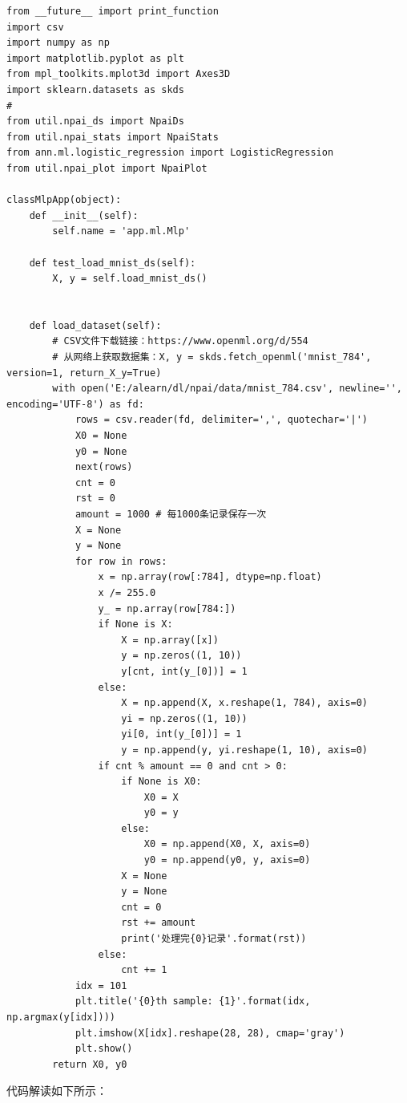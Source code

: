 \documentclass[UTF8]{article}
\begin{document}
\begin{lstlisting}
from __future__ import print_function
import csv
import numpy as np
import matplotlib.pyplot as plt
from mpl_toolkits.mplot3d import Axes3D
import sklearn.datasets as skds
#
from util.npai_ds import NpaiDs
from util.npai_stats import NpaiStats
from ann.ml.logistic_regression import LogisticRegression
from util.npai_plot import NpaiPlot

classMlpApp(object):
    def __init__(self):
        self.name = 'app.ml.Mlp'

    def test_load_mnist_ds(self):
        X, y = self.load_mnist_ds()


    def load_dataset(self):
        # CSV文件下载链接：https://www.openml.org/d/554
        # 从网络上获取数据集：X, y = skds.fetch_openml('mnist_784', version=1, return_X_y=True)
        with open('E:/alearn/dl/npai/data/mnist_784.csv', newline='', encoding='UTF-8') as fd:
            rows = csv.reader(fd, delimiter=',', quotechar='|')
            X0 = None
            y0 = None
            next(rows)
            cnt = 0
            rst = 0
            amount = 1000 # 每1000条记录保存一次
            X = None
            y = None
            for row in rows:
                x = np.array(row[:784], dtype=np.float)
                x /= 255.0
                y_ = np.array(row[784:])
                if None is X:
                    X = np.array([x])
                    y = np.zeros((1, 10))
                    y[cnt, int(y_[0])] = 1
                else:
                    X = np.append(X, x.reshape(1, 784), axis=0)
                    yi = np.zeros((1, 10))
                    yi[0, int(y_[0])] = 1
                    y = np.append(y, yi.reshape(1, 10), axis=0)
                if cnt % amount == 0 and cnt > 0:
                    if None is X0:
                        X0 = X
                        y0 = y
                    else:
                        X0 = np.append(X0, X, axis=0)
                        y0 = np.append(y0, y, axis=0)
                    X = None
                    y = None
                    cnt = 0
                    rst += amount
                    print('处理完{0}记录'.format(rst))
                else:
                    cnt += 1
            idx = 101
            plt.title('{0}th sample: {1}'.format(idx, np.argmax(y[idx])))
            plt.imshow(X[idx].reshape(28, 28), cmap='gray')
            plt.show()
        return X0, y0
\end{lstlisting}
代码解读如下所示：
\end{document}
